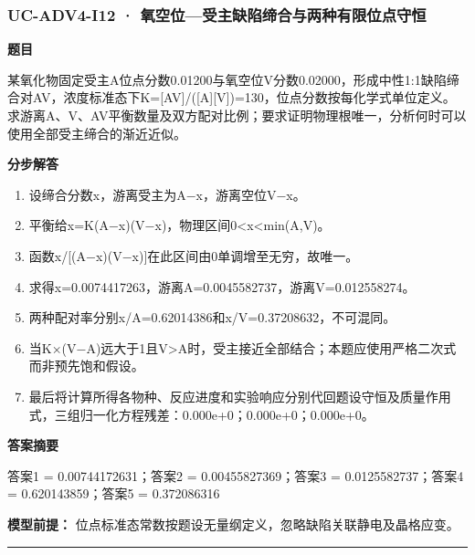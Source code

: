 \documentclass[UTF8,11pt,a4paper]{ctexart}
\begin{document}
\subsubsection*{UC-ADV4-I12 · 氧空位—受主缺陷缔合与两种有限位点守恒}
\noindent\textbf{题目}\par
某氧化物固定受主A位点分数0.01200与氧空位V分数0.02000，形成中性1:1缺陷缔合对AV，浓度标准态下K=[AV]/([A][V])=130，位点分数按每化学式单位定义。求游离A、V、AV平衡数量及双方配对比例；要求证明物理根唯一，分析何时可以使用全部受主缔合的渐近近似。\par
\medskip\noindent\textbf{分步解答}
\begin{enumerate}
\item 设缔合分数x，游离受主为A−x，游离空位V−x。
\item 平衡给x=K(A−x)(V−x)，物理区间0<x<min(A,V)。
\item 函数x/[(A−x)(V−x)]在此区间由0单调增至无穷，故唯一。
\item 求得x=0.0074417263，游离A=0.0045582737，游离V=0.012558274。
\item 两种配对率分别x/A=0.62014386和x/V=0.37208632，不可混同。
\item 当K×(V−A)远大于1且V>A时，受主接近全部结合；本题应使用严格二次式而非预先饱和假设。
\item 最后将计算所得各物种、反应进度和实验响应分别代回题设守恒及质量作用式，三组归一化方程残差：0.000e+0；0.000e+0；0.000e+0。
\end{enumerate}
\noindent\textbf{答案摘要}\par
答案1 = 0.00744172631；答案2 = 0.00455827369；答案3 = 0.0125582737；答案4 = 0.620143859；答案5 = 0.372086316\par
\noindent\textbf{模型前提：}
位点标准态常数按题设无量纲定义，忽略缺陷关联静电及晶格应变。\par
\medskip\hrule\medskip
{}
\end{document}
